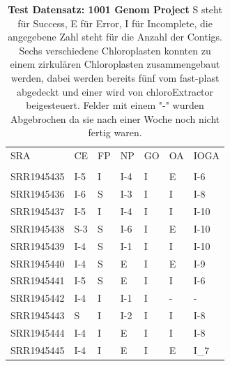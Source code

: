 \documentclass{scrartcl}
\begin{document}
\begin{table}[!h]
\caption[Test Datensatz: 1001 Genom Project, 11 Datensätze]{\textbf{Test Datensatz: 1001 Genom Project} S steht für Success, E für Error, I für Incomplete, die angegebene Zahl steht für die Anzahl der Contigs. Sechs verschiedene Chloroplasten konnten zu einem zirkulären Chloroplasten zusammengebaut werden, dabei werden bereits fünf vom fast-plast abgedeckt und einer wird von chloroExtractor beigesteuert. Felder mit einem "-" wurden Abgebrochen da sie nach einer Woche noch nicht fertig waren.}

\begin{center}
\begin{tabular}{lllllll}
SRA & CE & FP & NP & GO & OA & IOGA\\
 &  &  &  &  &  & \\
\hline
SRR1945435 & I-5 & I & I-4 & I & E & I-6\\
SRR1945436 & I-6 & S & I-3 & I & I & I-8\\
SRR1945437 & I-5 & I & I-4 & I & I & I-10\\
SRR1945438 & S-3 & S & I-6 & I & E & I-10\\
SRR1945439 & I-4 & S & I-1 & I & I & I-10\\
SRR1945440 & I-4 & S & E & I & E & I-9\\
SRR1945441 & I-5 & S & E & I & I & I-6\\
SRR1945442 & I-4 & I & I-1 & I & - & -\\
SRR1945443 & S & I & I-2 & I & I & I-8\\
SRR1945444 & I-4 & I & E & I & I & I-8\\
SRR1945445 & I-4 & I & E & I & E & I\_7\\
\end{tabular}
\end{center}
\end{table}
\end{document}
